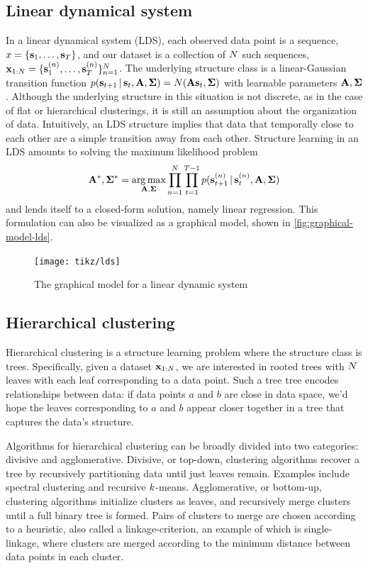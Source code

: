 \subsection{Linear dynamical system}
In a linear dynamical system (LDS), 
each observed data point is a sequence, 
$x = \{\mathbf{s}_1, \ldots, \mathbf{s}_{T}\}$, and our dataset
is a collection of $N$ such sequences, $\mathbf{x}_{1:N} = \{\mathbf{s}_1^{(n)}, \ldots, \mathbf{s}_{T}^{(n)}\}_{n = 1}^{N}$.
The underlying structure class is
a linear-Gaussian transition function $p(\mathbf{s}_{t + 1} \,|\, \mathbf{s}_t, \mathbf{A}, \bm{\Sigma}) = N(\mathbf{A} \mathbf{s}_t, \bm{\Sigma})$ with learnable parameters $\mathbf{A}, \bm{\Sigma}$.
Although the underlying structure in this situation
is not discrete, as in the case
of flat or hierarchical clusterings, it is still
an assumption about the organization of data. Intuitively,
an LDS structure implies that data that temporally
close to each other are a simple transition away from each other.
Structure learning in an LDS amounts
to solving the maximum
likelihood problem
\begin{align*}
    \mathbf{A}^*, \bm{\Sigma}^* = \operatorname*{arg\,max}_{\mathbf{A}, \bm{\Sigma}} \prod_{n = 1}^N \prod_{t = 1}^{T - 1} p(\mathbf{s}^{(n)}_{t + 1} \,|\, \mathbf{s}^{(n)}_t, \mathbf{A}, \bm{\Sigma})
\end{align*}
and lends itself to a closed-form solution, namely
linear regression. This formulation can also be visualized
as a graphical model, shown in \autoref{fig:graphical-model-lds}.

\begin{figure}[htp!]
    \centering
    \texttt{[image: tikz/lds]}
    \caption{The graphical model for a linear dynamic system}
    \label{fig:graphical-model-lds}
\end{figure}

\subsection{Hierarchical clustering}
Hierarchical clustering is a structure learning problem
where the structure class is trees. Specifically,
given a dataset $\mathbf{x}_{1:N}$,
we are interested in rooted trees with $N$ leaves
with each leaf corresponding to a data point.
Such a tree tree encodes relationships between data: 
if data points $a$ and $b$ are close in data space, we'd hope
the leaves corresponding to $a$ and $b$ appear closer
together in a tree that captures the data's structure.

Algorithms for hierarchical clustering can be broadly
divided into two categories: divisive and agglomerative.
Divisive, or top-down, clustering algorithms recover a tree by recursively
partitioning data until just leaves remain. Examples
include spectral clustering \citep{} and recursive $k$-means.
Agglomerative, or bottom-up, clustering algorithms
initialize clusters as leaves, and recursively
merge clusters until a full binary tree is formed.
Pairs of clusters to merge are chosen according to
a heuristic, also called a linkage-criterion,
an example of which is single-linkage,
where clusters are merged according to the minimum
distance between data points in each cluster.

